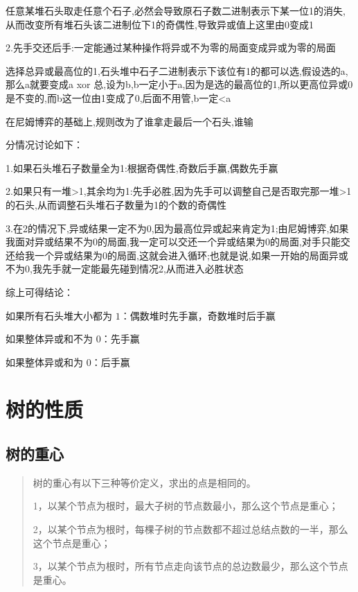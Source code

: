 \documentclass[UTF8,a4paper,11pt]{ctexart}
\newcommand{\topic}[1]{%
  \par\needspace{3\baselineskip}\vspace{0.45em}%
  \noindent{\bfseries\color{Primary}#1}\par\vspace{0.12em}%
}
\begin{document}
任意某堆石头取走任意个石子,必然会导致原石子数二进制表示下某一位1的消失,从而改变所有堆石头该二进制位下1的奇偶性,导致异或值上这里由0变成1

2.先手交还后手:一定能通过某种操作将异或不为零的局面变成异或为零的局面

选择总异或最高位的1,石头堆中石子二进制表示下该位有1的都可以选,假设选的a,那么a就要变成a xor 总,设为b,b一定小于a,因为是选的最高位的1,所以更高位异或0是不变的,而b这一位由1变成了0,后面不用管,b一定<a

\topic{反尼姆博弈}

在尼姆博弈的基础上,规则改为了谁拿走最后一个石头,谁输

分情况讨论如下：

1.如果石头堆石子数量全为1:根据奇偶性,奇数后手赢,偶数先手赢

2.如果只有一堆>1,其余均为1:先手必胜,因为先手可以调整自己是否取完那一堆>1的石头,从而调整石头堆石子数量为1的个数的奇偶性

3.在2的情况下,异或结果一定不为0,因为最高位异或起来肯定为1;由尼姆博弈,如果我面对异或结果不为0的局面,我一定可以交还一个异或结果为0的局面,对手只能交还给我一个异或结果为0的局面,这就会进入循环;也就是说,如果一开始的局面异或不为0,我先手就一定能最先碰到情况2,从而进入必胜状态

综上可得结论：

如果所有石头堆大小都为 $1$：偶数堆时先手赢，奇数堆时后手赢

如果整体异或和不为 $0$：先手赢

如果整体异或和为 $0$：后手赢

\section{树的性质}

\subsection{树的重心}

\topic{基本定义}

\begin{quote}
树的重心有以下三种等价定义，求出的点是相同的。\par
1，以某个节点为根时，最大子树的节点数最小，那么这个节点是重心；\par
2，以某个节点为根时，每棵子树的节点数都不超过总结点数的一半，那么这个节点是重心；\par
3，以某个节点为根时，所有节点走向该节点的总边数最少，那么这个节点是重心。\par
\end{quote}
\end{document}
